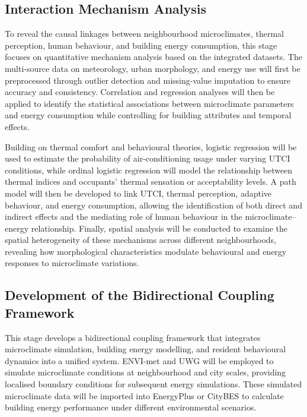 \subsection{Interaction Mechanism Analysis}

To reveal the causal linkages between neighbourhood microclimates, thermal perception, human behaviour, and building energy consumption, this stage focuses on quantitative mechanism analysis based on the integrated datasets. The multi-source data on meteorology, urban morphology, and energy use will first be preprocessed through outlier detection and missing-value imputation to ensure accuracy and consistency. Correlation and regression analyses will then be applied to identify the statistical associations between microclimate parameters and energy consumption while controlling for building attributes and temporal effects.

Building on thermal comfort and behavioural theories, logistic regression will be used to estimate the probability of air-conditioning usage under varying UTCI conditions, while ordinal logistic regression will model the relationship between thermal indices and occupants' thermal sensation or acceptability levels. A path model will then be developed to link UTCI, thermal perception, adaptive behaviour, and energy consumption, allowing the identification of both direct and indirect effects and the mediating role of human behaviour in the microclimate--energy relationship. Finally, spatial analysis will be conducted to examine the spatial heterogeneity of these mechanisms across different neighbourhoods, revealing how morphological characteristics modulate behavioural and energy responses to microclimate variations.

\subsection{Development of the Bidirectional Coupling Framework}

This stage develops a bidirectional coupling framework that integrates microclimate simulation, building energy modelling, and resident behavioural dynamics into a unified system. ENVI-met and UWG will be employed to simulate microclimate conditions at neighbourhood and city scales, providing localised boundary conditions for subsequent energy simulations. These simulated microclimate data will be imported into EnergyPlus or CityBES to calculate building energy performance under different environmental scenarios.


